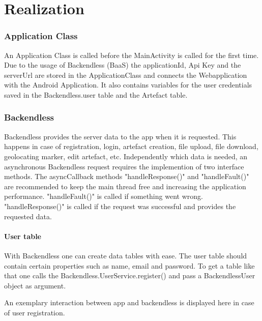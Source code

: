\newpage
\chapter{Realization}\label{cap:Realization}
\subsection{Application Class}
An Application Class is called before the MainActivity is called for the first time. Due to the usage of Backendless (BaaS) the applicationId, Api Key and the serverUrl are stored in the ApplicationClass and connects the Webapplication with the Android Application. It also contains variables for the user credentials saved in the Backendless.user table and the Artefact table. 

\subsection{Backendless}
Backendless provides the server data to the app when it is requested. This happens in case of registration, login, artefact creation, file upload, file download, geolocating marker, edit artefact, etc.
Independently which data is needed, an asynchronous Backendless request requires the implemention of two interface methods. The asyncCallback methods "handleResponse()" and "handleFault()" are recommended to keep the main thread free and increasing the application performance. "handleFault()" is called if something went wrong. "handleResponse()" is called if the request was successful and provides the requested data.

\subsubsection{User table}
With Backendless one can create data tables with ease. The user table should contain certain properties such as name, email and password. To get a table like that one calls the Backendless.UserService.register() and pass a BackendlessUser object as argument.

An exemplary interaction between app and backendless is displayed here in case of user registration.

